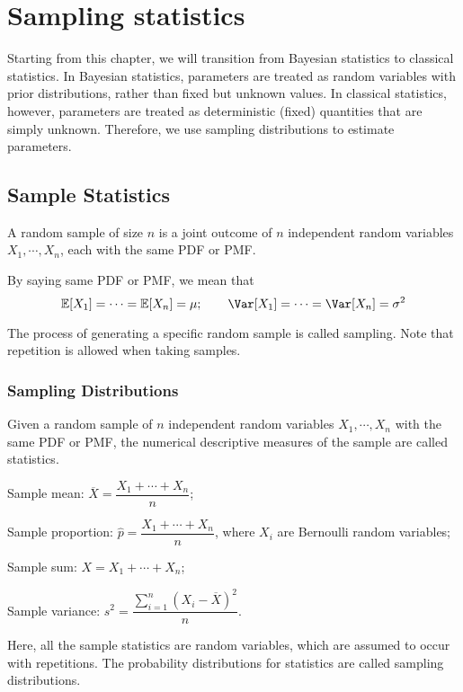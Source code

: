 \chapter{Sampling statistics}

Starting from this chapter, we will transition from Bayesian statistics to classical statistics. In Bayesian statistics, parameters are treated as random variables with prior distributions, rather than fixed but unknown values. In classical statistics, however, parameters are treated as deterministic (fixed) quantities that are simply unknown. Therefore, we use sampling distributions to estimate parameters.

\section{Sample Statistics}
A random sample of size \(n\) is a joint outcome of \(n\) independent random variables \(X_1, \cdots, X_n\), each with the same PDF or PMF. 
\begin{remark}
  By saying same PDF or PMF, we mean that 
  \[
    \mathbb{E}[X_1] = \cdots = \mathbb{E}[X_n] = \mu; \quad\quad \Var[X_1] = \cdots = \Var[X_n] = \sigma^2
  \]
\end{remark}

The process of generating a specific random sample is called sampling. Note that repetition is allowed when taking samples.

\subsection{Sampling Distributions}
Given a random sample of \(n\) independent random variables \(X_1, \cdots, X_n\) with the same PDF or PMF, the numerical descriptive measures of the sample are called statistics. 

Sample mean: \(\overline{X} = \dfrac{X_1 + \cdots + X_n}{n}\); 

Sample proportion: \(\hat{p} = \dfrac{X_1 + \cdots + X_n}{n}\), where \(X_i\) are Bernoulli random variables; 

Sample sum: \(X = X_1 + \cdots + X_n\); 

Sample variance: \(s^2 = \dfrac{\sum_{i = 1}^n (X_i - \overline{X})^2}{n}\). 

Here, all the sample statistics are random variables, which are assumed to occur with repetitions. The probability distributions for statistics are called sampling distributions.

